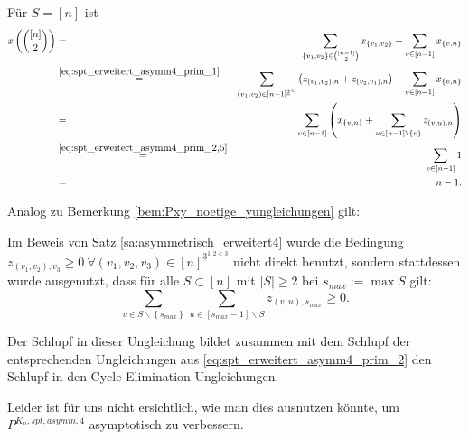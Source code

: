 \documentclass[10p,a4paper,BCOR = 12mm, DIV=15]{scrbook}
\begin{document}
\begin{bew}
Für $S = \left[n\right]$ ist
{
\allowdisplaybreaks
\begin{eqnarray*}
x\left({\left[n\right] \choose 2}\right) & = & \sum_{\left\{v_1, v_2\right\} \in {\left[n-1\right] \choose 2}} x_{\left\{v_1, v_2\right\}} + \sum_{v \in \left[n-1\right]} x_{\left\{v, n\right\}} \\
& \stackrel{\eqref{eq:spt_erweitert_asymm4_prim_1}}{=} & \sum_{\left(v_1, v_2\right) \in \left[n-1\right]^{\underline{2}^<}} \left(z_{\left(v_1, v_2\right), n} + z_{\left(v_2, v_1\right), n}\right) + \sum_{v \in \left[n-1\right]} x_{\left\{v, n\right\}} \\
& = & \sum_{v \in \left[n-1\right]} \left(x_{\left\{v, n\right\}} + \sum_{u \in \left[n-1\right] \backslash \left\{v\right\}} z_{\left(v, u\right), n}\right) \\
& \stackrel{\eqref{eq:spt_erweitert_asymm4_prim_2,5}}{=} & \sum_{v \in \left[n-1\right] } 1 \\
& = & n - 1.
\end{eqnarray*}
}
\end{bew}

Analog zu Bemerkung \ref{bem:Pxy_noetige_yungleichungen} gilt:

\begin{Bem}
\label{bem:Pasymm4_noetige_yungleichungen}
Im Beweis von Satz \ref{sa:asymmetrisch_erweitert4} wurde die Bedingung $z_{\left(v_1, v_2\right), v_3} \geq 0 \ \forall \left(v_1, v_2, v_3\right)\in \left[n\right]^{\underline{3}^{1, 2<3}}$ nicht direkt benutzt, sondern stattdessen wurde ausgenutzt, dass für alle $S\subset \left[n\right]$ mit $\left|S\right| \geq 2$ bei $s_{max} := \max S$ gilt:
\begin{displaymath}
\sum_{v \in S \backslash \left\{s_{max}\right\}} \sum_{u \in \left[s_{max}-1\right] \backslash S} z_{\left(v, u\right), s_{max}} \geq 0.
\end{displaymath}

Der Schlupf in dieser Ungleichung bildet zusammen mit dem Schlupf der entsprechenden Ungleichungen aus \eqref{eq:spt_erweitert_asymm4_prim_2} den Schlupf in den Cycle-Elimination-Ungleichungen.

Leider ist für uns nicht ersichtlich, wie man dies ausnutzen könnte, um $P^{K_n, spt, asymm, 4}$ asymptotisch zu verbessern.
\end{Bem}
\end{document}
